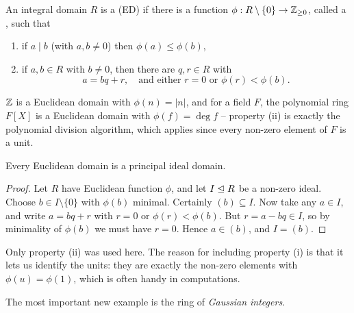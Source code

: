\documentclass[a4paper]{scrartcl}
\begin{document}
\begin{definition}
	An integral domain $R$ is a  (ED) if there is a function $\phi: R \setminus \{0\} \rightarrow \mathbb{Z}_{\geq 0}$, called a , such that
	\begin{enumerate}[label=(\roman*)]
		\item if $a \mid b$ (with $a,b \neq 0$) then $\phi(a) \leq \phi(b)$,
		\item if $a, b \in R$ with $b \neq 0$, then there are $q, r \in R$ with
		$$
		a = bq + r, \quad \text{and either } r = 0 \text{ or } \phi(r) < \phi(b).
		$$
	\end{enumerate}
\end{definition}

\begin{example}
	$\mathbb{Z}$ is a Euclidean domain with $\phi(n) = |n|$, and for a field $F$, the polynomial ring $F[X]$ is a Euclidean domain with $\phi(f) = \deg f$ -- property (ii) is exactly the polynomial division algorithm, which applies since every non-zero element of $F$ is a unit.
\end{example}

\begin{proposition}
	Every Euclidean domain is a principal ideal domain.
\end{proposition}
\begin{proof}
	Let $R$ have Euclidean function $\phi$, and let $I \trianglelefteq R$ be a non-zero ideal. Choose $b \in I \setminus \{0\}$ with $\phi(b)$ minimal. Certainly $(b) \subseteq I$. Now take any $a \in I$, and write $a = bq + r$ with $r = 0$ or $\phi(r) < \phi(b)$. But $r = a - bq \in I$, so by minimality of $\phi(b)$ we must have $r = 0$. Hence $a \in (b)$, and $I = (b)$.
\end{proof}

\begin{remark}
	Only property (ii) was used here. The reason for including property (i) is that it lets us identify the units: they are exactly the non-zero elements with $\phi(u) = \phi(1)$, which is often handy in computations.
\end{remark}

The most important new example is the ring of \emph{Gaussian integers}.
\end{document}
